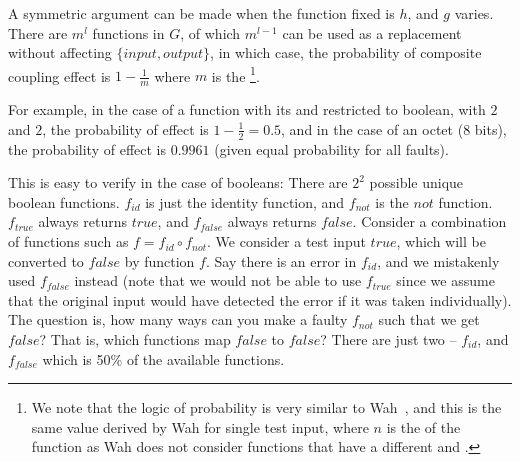 \documentclass[preprint,nonatbib]{sigplanconf}\usepackage[]{graphicx}\usepackage[]{color}
\begin{document}
A symmetric argument can be made when the function fixed is $h$, and $g$
varies. There are $m^l$ functions in $G$, of which $m^{l-1}$ can be used as
a replacement without affecting $\{input, output\}$, in which case, the
probability of composite coupling effect is $1 - \frac{1}{m}$
where $m$ is the \foutput
\footnote{We note that the logic of probability is very similar to
Wah~\cite{wah2000atheoretical}, and this is the same value derived by Wah
for single test input, where $n$ is the \finput of the function as Wah
does not consider functions that have a different \finput and \foutput.}.

For example, in the case of a function with its \finput and \foutput restricted to
boolean, with \finput $2$ and \foutput $2$, the probability of \couplingC effect
is $1 - \frac{1}{2} = 0.5$, and in the
case of an octet ($8$ bits), the probability of \couplingC effect
is $0.9961$ (given equal probability for all faults).

This is easy to verify in the case of booleans: There are $2^2$ possible unique
boolean functions. $f_{id}$ is just the identity function, and $f_{not}$ is the $not$
function. $f_{true}$ always returns $true$, and $f_{false}$ always returns
$false$. Consider a combination of functions such as $f = f_{id} \circ f_{not}$.
We consider a test input $true$, which will be converted to $false$ by
function $f$. Say there is an error in $f_{id}$, and we mistakenly used
$f_{false}$ instead (note that we would not be able to use $f_{true}$ since we
assume that the original input would have detected the error if it was taken
individually). The question is, how many ways can you make a faulty
$f_{not}$ such that we get $false$? That is, which functions map $false$ to $false$?
There are just two -- $f_{id}$, and $f_{false}$ which is 50\% of the available
functions.
\end{document}
